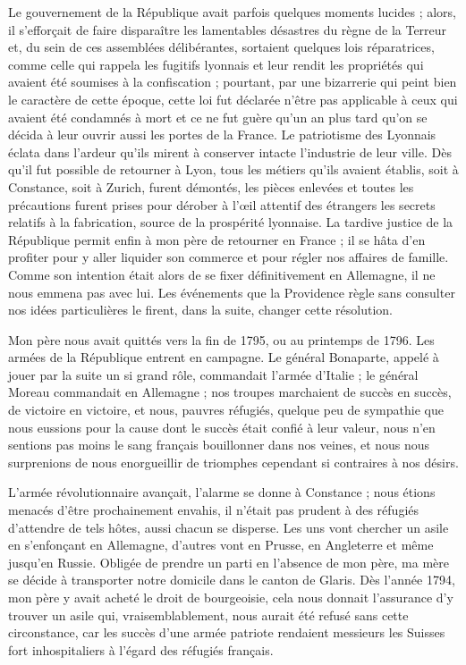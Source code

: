 \documentclass[11pt,a4paper]{report}
\begin{document}
Le gouvernement de la République avait parfois quelques moments lucides ; alors, il s'efforçait de faire disparaître les lamentables désastres du règne de la Terreur et, du sein de ces assemblées délibérantes, sortaient quelques lois réparatrices, comme celle qui rappela les fugitifs lyonnais et leur rendit les propriétés qui avaient été soumises à la confiscation ; pourtant, par une bizarrerie qui peint bien le caractère de cette époque, cette loi fut déclarée n'être pas applicable à ceux qui avaient été condamnés à mort et ce ne fut guère qu'un an plus tard qu'on se décida à leur ouvrir aussi les portes de la France. Le patriotisme des Lyonnais éclata dans l'ardeur qu'ils mirent à conserver intacte l'industrie de leur ville. Dès qu'il fut possible de retourner à Lyon, tous les métiers qu'ils avaient établis, soit à Constance, soit à Zurich, furent démontés, les pièces enlevées et toutes les précautions furent prises pour dérober à l'œil attentif des étrangers les secrets relatifs à la fabrication, source de la prospérité lyonnaise. La tardive justice de la République permit enfin à mon père de retourner en France ; il se hâta d'en profiter pour y aller liquider son commerce et pour régler nos affaires de famille. Comme son intention était alors de se fixer définitivement en Allemagne, il ne nous emmena pas avec lui. Les événements que la Providence règle sans consulter nos idées particulières le firent, dans la suite, changer cette résolution.

Mon père nous avait quittés vers la fin de 1795, ou au printemps de 1796. Les armées de la République entrent en campagne. Le général Bonaparte, appelé à jouer par la suite un si grand rôle, commandait l'armée d'Italie ; le général Moreau commandait en Allemagne ; nos troupes marchaient de succès en succès, de victoire en victoire, et nous, pauvres réfugiés, quelque peu de sympathie que nous eussions pour la cause dont le succès était confié à leur valeur, nous n'en sentions pas moins le sang français bouillonner dans nos veines, et nous nous surprenions de nous enorgueillir de triomphes cependant si contraires à nos désirs.

L'armée révolutionnaire avançait, l'alarme se donne à Constance ; nous étions menacés d'être prochainement envahis, il n'était pas prudent à des réfugiés d'attendre de tels hôtes, aussi chacun se disperse. Les uns vont chercher un asile en s'enfonçant en Allemagne, d'autres vont en Prusse, en Angleterre et même jusqu'en Russie. Obligée de prendre un parti en l'absence de mon père, ma mère se décide à transporter notre domicile dans le canton de Glaris. Dès l'année 1794, mon père y avait acheté le droit de bourgeoisie, cela nous donnait l'assurance d'y trouver un asile qui, vraisemblablement, nous aurait été refusé sans cette circonstance, car les succès d'une armée patriote rendaient messieurs les Suisses fort inhospitaliers à l'égard des réfugiés français.
\end{document}
